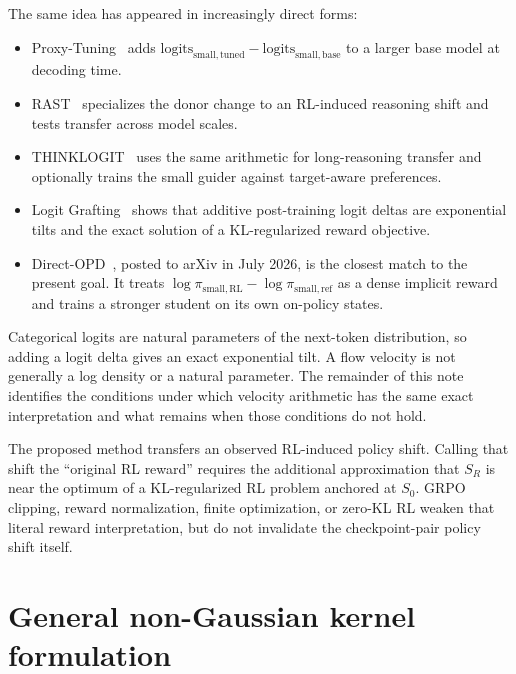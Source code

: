 \documentclass[11pt,a4paper]{article}
\newcommand{\Sbase}{S_0}
\newcommand{\Srl}{S_R}
\theoremstyle{plain}
\theoremstyle{definition}
\begin{document}
The same idea has appeared in increasingly direct forms:
\begin{itemize}[leftmargin=1.6em]
\item Proxy-Tuning~\cite{proxytuning} adds
      $\text{logits}_{\mathrm{small,tuned}}-\text{logits}_{\mathrm{small,base}}$
      to a larger base model at decoding time.
\item RAST~\cite{rast} specializes the donor change to an RL-induced reasoning shift and tests
      transfer across model scales.
\item THINKLOGIT~\cite{thinklogit} uses the same arithmetic for long-reasoning transfer and
      optionally trains the small guider against target-aware preferences.
\item Logit Grafting~\cite{logitgrafting} shows that additive post-training logit deltas are
      exponential tilts and the exact solution of a KL-regularized reward objective.
\item Direct-OPD~\cite{directopd}, posted to arXiv in July 2026, is the closest match to the present
      goal.  It treats
      $\log\pi_{\mathrm{small,RL}}-\log\pi_{\mathrm{small,ref}}$
      as a dense implicit reward and trains a stronger student on its own on-policy states.
\end{itemize}

Categorical logits are natural parameters of the next-token distribution, so adding a logit
delta gives an exact exponential tilt.  A flow velocity is not generally a log density or a
natural parameter.  The remainder of this note identifies the conditions under which velocity
arithmetic has the same exact interpretation and what remains when those conditions do not hold.

\begin{tcolorbox}[colback=gray!5,colframe=gray!55,title=Scope]
The proposed method transfers an observed RL-induced policy shift.  Calling that shift the
``original RL reward'' requires the additional approximation that $\Srl$ is near the optimum of a
KL-regularized RL problem anchored at $\Sbase$.  GRPO clipping, reward normalization, finite
optimization, or zero-KL RL weaken that literal reward interpretation, but do not invalidate the
checkpoint-pair policy shift itself.
\end{tcolorbox}

\section{General non-Gaussian kernel formulation}
\label{sec:kernel}
\end{document}
